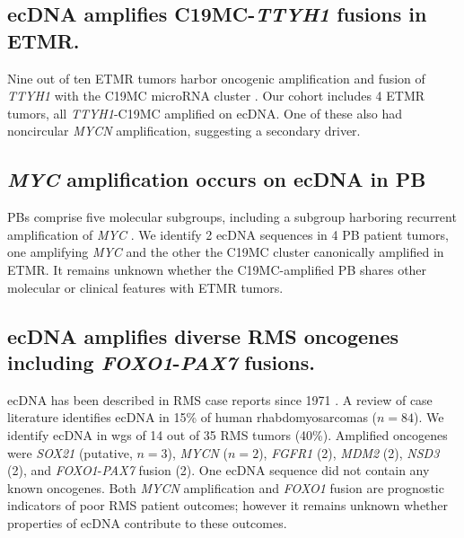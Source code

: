 \subsection{ecDNA amplifies C19MC-\textit{TTYH1} fusions in \acrlong{ETMR}.} Nine out of ten \gls{ETMR} tumors harbor oncogenic amplification and fusion of \textit{TTYH1} with the C19MC microRNA cluster \cite{li_2009, lambo_2019}. Our cohort includes 4 \gls{ETMR} tumors, all \textit{TTYH1}-C19MC amplified on ecDNA. One of these also had noncircular \textit{MYCN} amplification, suggesting a secondary driver.

\subsection{\textit{MYC} amplification occurs on ecDNA in \acrlong{PB}} \Glspl{PB} comprise five molecular subgroups, including a subgroup harboring recurrent amplification of \textit{MYC} \cite{li_2020}. We identify 2 ecDNA sequences in 4 \gls{PB} patient tumors, one amplifying \textit{MYC} and the other the C19MC cluster canonically amplified in \gls{ETMR}. It remains unknown whether the C19MC-amplified \gls{PB} shares other molecular or clinical features with \gls{ETMR} tumors.

\subsection{ecDNA amplifies diverse \acrlong{RMS} oncogenes including \textit{FOXO1}-\textit{PAX7} fusions.}
ecDNA has been described in \gls{RMS} case reports since 1971 \cite{granberg_1971, steilen-gimbel_1996, meddeb_1996, gil-benso_2003, mysorekar_2008}. A review of case literature  \cite{gebhart_2005} identifies ecDNA in 15\% of human rhabdomyosarcomas ($n=84$). We identify ecDNA in \gls{wgs} of 14 out of 35 \gls{RMS} tumors (40\%). Amplified oncogenes were \textit{SOX21} (putative, $n=3$), \textit{MYCN} ($n=2$), \textit{FGFR1} (2), \textit{MDM2} (2), \textit{NSD3} (2), and \textit{FOXO1}-\textit{PAX7} fusion (2). One ecDNA  sequence did not contain any known oncogenes. Both \textit{MYCN} amplification  \cite{williamson_2005} and \textit{FOXO1} fusion \cite{missiaglia_2012} are prognostic indicators of poor \gls{RMS} patient outcomes; however it remains unknown whether properties of ecDNA contribute to these outcomes.

